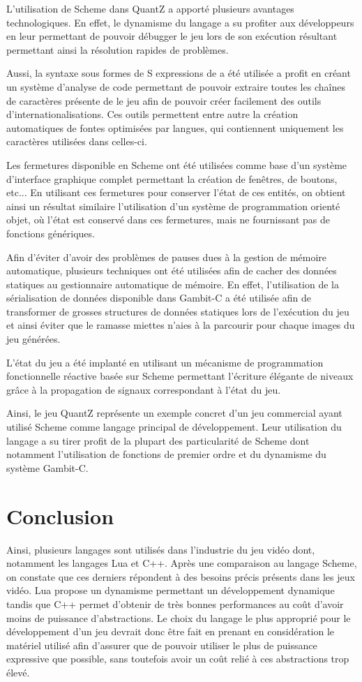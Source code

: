 \documentclass[12pt,oneside,letterpaper,francais]{book}
\begin{document}
L'utilisation de Scheme dans QuantZ a apporté plusieurs avantages
technologiques. En effet, le dynamisme du langage a su profiter aux
développeurs en leur permettant de pouvoir débugger le jeu lors de son
exécution résultant permettant ainsi la résolution rapides de
problèmes.

Aussi, la syntaxe sous formes de S expressions de a été utilisée a
profit en créant un système d'analyse de code permettant de pouvoir
extraire toutes les chaînes de caractères présente de le jeu afin de
pouvoir créer facilement des outils d'internationalisations. Ces
outils permettent entre autre la création automatiques de fontes
optimisées par langues, qui contiennent uniquement les caractères
utilisées dans celles-ci.

Les fermetures disponible en Scheme ont été utilisées comme base d'un
système d'interface graphique complet permettant la création de
fenêtres, de boutons, etc... En utilisant ces fermetures pour
conserver l'état de ces entités, on obtient ainsi un résultat
similaire l'utilisation d'un système de programmation orienté objet,
où l'état est conservé dans ces fermetures, mais ne fournissant pas de
fonctions génériques.

Afin d'éviter d'avoir des problèmes de pauses dues à la gestion de
mémoire automatique, plusieurs techniques ont été utilisées afin de
cacher des données statiques au gestionnaire automatique de
mémoire. En effet, l'utilisation de la sérialisation de données
disponible dans Gambit-C a été utilisée afin de transformer de grosses
structures de données statiques lors de l'exécution du jeu et ainsi
éviter que le ramasse miettes n'aies à la parcourir pour chaque images
du jeu générées.

L'état du jeu a été implanté en utilisant un mécanisme de
programmation fonctionnelle réactive basée sur Scheme permettant
l'écriture élégante de niveaux grâce à la propagation de signaux
correspondant à l'état du jeu.

Ainsi, le jeu QuantZ représente un exemple concret d'un jeu commercial
ayant utilisé Scheme comme langage principal de développement. Leur
utilisation du langage a su tirer profit de la plupart des
particularité de Scheme dont notamment l'utilisation de fonctions de
premier ordre et du dynamisme du système Gambit-C.

\section{Conclusion}
Ainsi, plusieurs langages sont utilisés dans l'industrie du jeu vidéo
dont, notamment les langages Lua et C++. Après une comparaison au
langage Scheme, on constate que ces derniers répondent à des besoins
précis présents dans les jeux vidéo. Lua propose un dynamisme
permettant un développement dynamique tandis que C++ permet d'obtenir
de très bonnes performances au coût d'avoir moins de puissance
d'abstractions. Le choix du langage le plus approprié pour le
développement d'un jeu devrait donc être fait en prenant en
considération le matériel utilisé afin d'assurer que de pouvoir
utiliser le plus de puissance expressive que possible, sans toutefois
avoir un coût relié à ces abstractions trop élevé.
\end{document}
